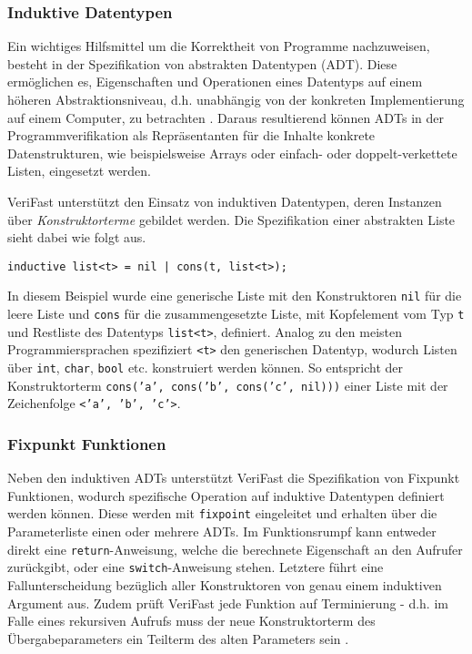 \subsubsection{Induktive Datentypen}
\label{subsubsec:adt}

Ein wichtiges Hilfsmittel um die Korrektheit von Programme nachzuweisen, besteht in der Spezifikation von abstrakten Datentypen (ADT). Diese ermöglichen es, Eigenschaften und Operationen eines Datentyps auf einem höheren Abstraktionsniveau, d.h. unabhängig von der konkreten Implementierung auf einem Computer, zu betrachten \cite[S. 265]{Saake2014}. Daraus resultierend können ADTs in der Programmverifikation als Repräsentanten für die Inhalte konkrete Datenstrukturen, wie beispielsweise Arrays oder einfach- oder doppelt-verkettete Listen, eingesetzt werden.

VeriFast unterstützt den Einsatz von induktiven Datentypen, deren Instanzen über \emph{Konstruktorterme} gebildet werden. Die Spezifikation einer abstrakten Liste sieht dabei wie folgt aus.

\begin{lstlisting}
inductive list<t> = nil | cons(t, list<t>);
\end{lstlisting}

\noindent
In diesem Beispiel wurde eine generische Liste mit den Konstruktoren \texttt{nil} für die leere Liste und \texttt{cons} für die zusammengesetzte Liste, mit Kopfelement vom Typ \texttt{t} und Restliste des Datentyps \texttt{list<t>}, definiert. Analog zu den meisten Programmiersprachen spezifiziert \texttt{<t>} den generischen Datentyp, wodurch Listen über \texttt{int}, \texttt{char}, \texttt{bool} etc. konstruiert werden können. So entspricht der Konstruktorterm \texttt{cons('a', cons('b', cons('c', nil)))} einer Liste mit der Zeichenfolge \texttt{<'a', 'b', 'c'>}.

\subsubsection{Fixpunkt Funktionen}

Neben den induktiven ADTs unterstützt VeriFast die Spezifikation von Fixpunkt Funktionen, wodurch spezifische Operation auf induktive Datentypen definiert werden können. Diese werden mit \texttt{fixpoint} eingeleitet und erhalten über die Parameterliste einen oder mehrere ADTs. Im Funktionsrumpf kann entweder direkt eine \texttt{return}-Anweisung, welche die berechnete Eigenschaft an den Aufrufer zurückgibt, oder eine \texttt{switch}-Anweisung stehen. Letztere führt eine Fallunterscheidung bezüglich aller Konstruktoren von genau einem induktiven Argument aus. Zudem prüft VeriFast jede Funktion auf Terminierung - d.h. im Falle eines rekursiven Aufrufs muss der neue Konstruktorterm des Übergabeparameters ein Teilterm des alten Parameters sein \cite{Jacobs2010}.

